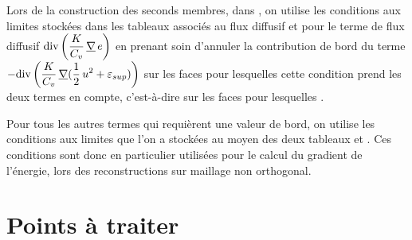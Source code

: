 Lors de la construction des seconds membres, dans , on utilise les
conditions aux limites stockées dans les tableaux associés au flux
diffusif
 et
 pour le terme de flux diffusif
$\displaystyle\text{div}\,{\left(\frac{K}{C_v}\,\underline{\nabla}\,e\right)}$
en prenant soin d'annuler la contribution de bord du terme
$\displaystyle-\text{div}\,{\left(\frac{K}{C_v}\,\underline{\nabla}{(\frac{1}{2}\,u^2+\varepsilon_{sup})}\right)}$
sur les faces pour lesquelles cette condition
prend les deux termes en compte, c'est-à-dire sur les faces pour lesquelles
.

Pour tous les autres termes qui requièrent une valeur de bord, on utilise les
conditions aux limites que l'on a stockées au moyen des deux tableaux
 et
. Ces conditions sont
donc en particulier utilisées pour le calcul du gradient de l'énergie,
lors des reconstructions sur maillage non orthogonal.


\newpage
\section*{Points à traiter}
\label{Cfbl_Cfxtcl_prg_a_traiter}%



